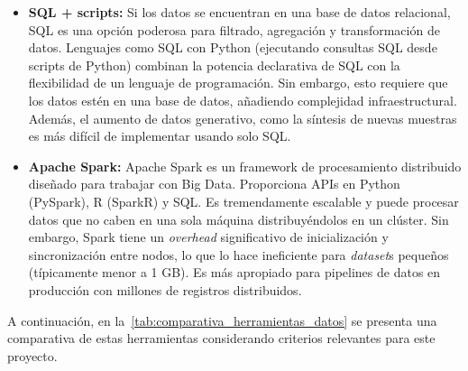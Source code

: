 \begin{itemize}
    \item \textbf{SQL + scripts:} Si los datos se encuentran en una base de datos relacional, SQL es una opción poderosa para filtrado, agregación y transformación de datos. Lenguajes como SQL con Python (ejecutando consultas SQL desde scripts de Python) combinan la potencia declarativa de SQL con la flexibilidad de un lenguaje de programación. Sin embargo, esto requiere que los datos estén en una base de datos, añadiendo complejidad infraestructural. Además, el aumento de datos generativo, como la síntesis de nuevas muestras es más difícil de implementar usando solo SQL\@.
    \item \textbf{Apache Spark:} Apache Spark es un framework de procesamiento distribuido diseñado para trabajar con Big Data\@. Proporciona APIs en Python (PySpark), R (SparkR) y SQL\@. Es tremendamente escalable y puede procesar datos que no caben en una sola máquina distribuyéndolos en un clúster. Sin embargo, Spark tiene un \textit{overhead} significativo de inicialización y sincronización entre nodos, lo que lo hace ineficiente para \textit{dataset}s pequeños (típicamente menor a 1 GB). Es más apropiado para pipelines de datos en producción con millones de registros distribuidos.
\end{itemize}

A continuación, en la~\autoref{tab:comparativa_herramientas_datos} se presenta una comparativa de estas herramientas considerando criterios relevantes para este proyecto.

